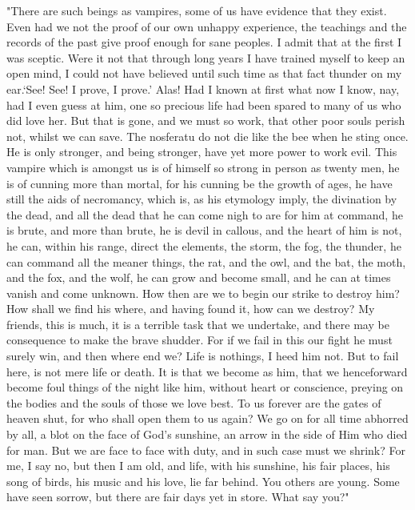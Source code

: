 "There are such beings as vampires, some of us have evidence that they exist. Even had we not the proof of our own unhappy experience, the teachings and the records of the past give proof enough for sane peoples. I admit that at the first I was sceptic. Were it not that through long years I have trained myself to keep an open mind, I could not have believed until such time as that fact thunder on my ear.`See! See! I prove, I prove.' Alas! Had I known at first what now I know, nay, had I even guess at him, one so precious life had been spared to many of us who did love her. But that is gone, and we must so work, that other poor souls perish not, whilst we can save. The nosferatu do not die like the bee when he sting once. He is only stronger, and being stronger, have yet more power to work evil. This vampire which is amongst us is of himself so strong in person as twenty men, he is of cunning more than mortal, for his cunning be the growth of ages, he have still the aids of necromancy, which is, as his etymology imply, the divination by the dead, and all the dead that he can come nigh to are for him at command, he is brute, and more than brute, he is devil in callous, and the heart of him is not, he can, within his range, direct the elements, the storm, the fog, the thunder, he can command all the meaner things, the rat, and the owl, and the bat, the moth, and the fox, and the wolf, he can grow and become small, and he can at times vanish and come unknown. How then are we to begin our strike to destroy him? How shall we find his where, and having found it, how can we destroy? My friends, this is much, it is a terrible task that we undertake, and there may be consequence to make the brave shudder. For if we fail in this our fight he must surely win, and then where end we? Life is nothings, I heed him not. But to fail here, is not mere life or death. It is that we become as him, that we henceforward become foul things of the night like him, without heart or conscience, preying on the bodies and the souls of those we love best. To us forever are the gates of heaven shut, for who shall open them to us again? We go on for all time abhorred by all, a blot on the face of God's sunshine, an arrow in the side of Him who died for man. But we are face to face with duty, and in such case must we shrink? For me, I say no, but then I am old, and life, with his sunshine, his fair places, his song of birds, his music and his love, lie far behind. You others are young. Some have seen sorrow, but there are fair days yet in store. What say you?" 

